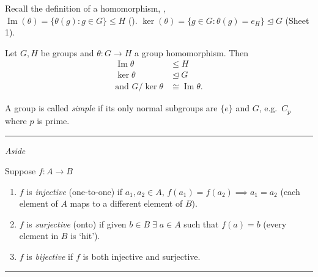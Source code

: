 \medskip

Recall the definition of a homomorphism, , \\
$\operatorname{Im}(\theta) = \{ \theta (g) : g \in G \} \leq H$ ().
$\ker(\theta) = \{ g \in G : \theta (g) = e_H \} \trianglelefteq G$ (Sheet 1).

\begin{theorem}
\protect\hypertarget{thm:six}{}\label{thm:six}
Let $G, H$ be groups and $\theta : G \to H$ a group homomorphism.
Then \begin{align*}
    \operatorname{Im} \theta &\leq H \\
    \ker \theta &\trianglelefteq G \\
    \text{and } G / \ker \theta &\cong \operatorname{Im} \theta.
\end{align*}
\end{theorem}

\begin{definition}
\protect\hypertarget{def:sixteen}{}\label{def:sixteen}
A group is called \emph{simple} if its only normal subgroups are $\{ e \}$ and $G$,
e.g.~$C_p$ where $p$ is prime.
\end{definition}

\begin{center}\rule{\linewidth}{0.5pt}\end{center}

\emph{Aside}

\begin{definition}
  Suppose $f : A \to B$

  \begin{enumerate}
  \def\labelenumi{\roman{enumi}.}
  \item
    $f$ is \emph{injective} (one-to-one) if $a_1, a_2 \in A$, $f(a_1) = f(a_2) \implies a_1 = a_2$ (each element of $A$ maps to a different element of $B$).
  \item
    $f$ is \emph{surjective} (onto) if given $b \in B \; \exists \; a \in A$ such that $f(a) = b$ (every element in $B$ is `hit').
  \item
    $f$ is \emph{bijective} if $f$ is both injective and surjective.
  \end{enumerate}
\end{definition}

\begin{center}\rule{\linewidth}{0.5pt}\end{center}

